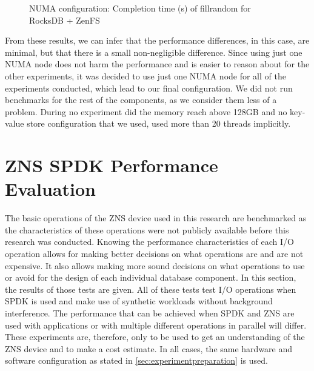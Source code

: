 \begin{figure}[!ht]
    \hspace*{-0.075\textwidth} %
    \raggedleft
    \caption{  NUMA configuration: Completion time (s) of fillrandom for RocksDB + ZenFS  }
    \label{fig:numa}
\end{figure}

From these results, we can infer that the performance differences, in this case, are minimal, but that there is a small non-negligible difference. Since using just one NUMA node does not harm the performance and is easier to reason about for the other experiments, it was decided to use just one NUMA node for all of the experiments conducted, which lead to our final configuration. We did not run benchmarks for the rest of the components, as we consider them less of a problem. During no experiment did the memory reach above 128GB and no key-value store configuration that we used, used more than 20 threads implicitly.  

\section{ZNS SPDK Performance Evaluation}
\label{sec:znsperf}
The basic operations of the ZNS device used in this research are benchmarked as the characteristics of these operations were not publicly available before this research was conducted. Knowing the performance characteristics of each I/O operation allows for making better decisions on what operations are and are not expensive. It also allows making more sound decisions on what operations to use or avoid for the design of each individual database component. In this section, the results of those tests are given. All of these tests test I/O operations when SPDK is used and make use of synthetic workloads without background interference. The performance that can be achieved when SPDK and ZNS are used with applications or with multiple different operations in parallel will differ. These experiments are, therefore, only to be used to get an understanding of the ZNS device and to make a cost estimate. In all cases, the same hardware and software configuration as stated in \autoref{sec:experimentpreparation} is used.

